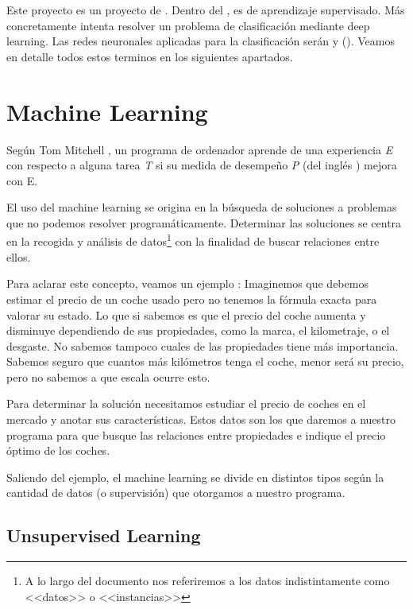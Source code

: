 

Este proyecto es un proyecto de . Dentro del , es de aprendizaje supervisado. Más concretamente intenta resolver un problema de clasificación mediante deep learning. Las redes neuronales aplicadas para la clasificación serán  y  (). Veamos en detalle todos estos terminos en los siguientes apartados.

\section{Machine Learning}

Según Tom Mitchell , un programa de ordenador aprende de una experiencia \textit{E} con respecto a alguna tarea \textit{T} si su medida de desempeño \textit{P} (del inglés ) mejora con E.

El uso del machine learning se origina en la búsqueda de soluciones a problemas que no podemos resolver programáticamente. Determinar las soluciones se centra en la recogida y análisis de datos\footnote{A lo largo del documento nos referiremos a los datos indistintamente como <<datos>> o <<instancias>>} con la finalidad de buscar relaciones entre ellos.

Para aclarar este concepto, veamos un ejemplo \label{example:car_price}:
Imaginemos que debemos estimar el precio de un coche usado pero no tenemos la fórmula exacta para valorar su estado. Lo que si sabemos es que el precio del coche aumenta y disminuye dependiendo de sus propiedades, como la marca, el kilometraje, o el desgaste. No sabemos tampoco cuales de las propiedades tiene más importancia. Sabemos seguro que cuantos más kilómetros tenga el coche, menor será su precio, pero no sabemos a que escala ocurre esto.

Para determinar la solución necesitamos estudiar el precio de coches en el mercado y anotar sus características. Estos datos son los que daremos a nuestro programa para que busque las relaciones entre propiedades e indique el precio óptimo de los coches.

Saliendo del ejemplo, el machine learning se divide en distintos tipos según la cantidad de datos (o supervisión) que otorgamos a nuestro programa.

\subsection{Unsupervised Learning}

